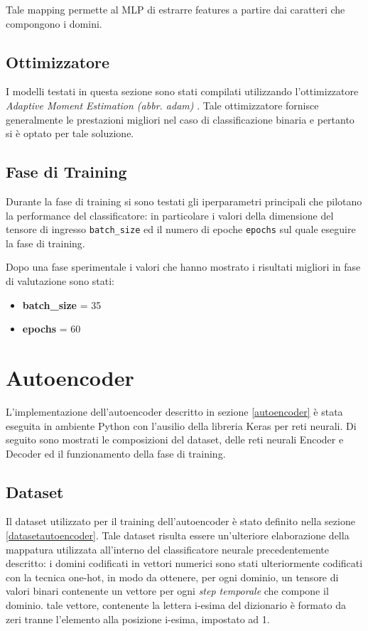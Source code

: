Tale mapping permette al MLP di estrarre features a partire dai caratteri che compongono i domini.

\subsection{Ottimizzatore}
I modelli testati in questa sezione sono stati compilati utilizzando l'ottimizzatore \textit{Adaptive Moment Estimation (abbr. adam)} \cite{adam}. Tale ottimizzatore fornisce generalmente le prestazioni migliori nel caso di classificazione binaria e pertanto si è optato per tale soluzione.

\subsection{Fase di Training}
Durante la fase di training si sono testati gli iperparametri principali che pilotano la performance del classificatore: in particolare i valori della dimensione del tensore di ingresso  \lstinline!batch_size! ed il numero di epoche \lstinline!epochs! sul quale eseguire la fase di training.

Dopo una fase sperimentale i valori che hanno mostrato i risultati migliori in fase di valutazione sono stati: 
\begin{itemize}
\item \textbf{batch\_size} = 35 
\item \textbf{epochs} = 60
\end{itemize}

\newpage
\section{Autoencoder}
\label{imp:autoencoder}
L'implementazione dell'autoencoder descritto in sezione \ref{autoencoder} è stata eseguita in ambiente Python con l'ausilio della libreria Keras per reti neurali. Di seguito sono mostrati le composizioni del dataset, delle reti neurali Encoder e Decoder ed il funzionamento della fase di training.


\subsection{Dataset}
\label{imp:autoencoder:dataset}
Il dataset utilizzato per il training dell'autoencoder è stato definito nella sezione \ref{datasetautoencoder}. Tale dataset risulta essere un'ulteriore elaborazione della mappatura utilizzata all'interno del classificatore neurale precedentemente descritto: i domini codificati in vettori numerici sono stati ulteriormente codificati con la tecnica one-hot, in modo da ottenere, per ogni dominio, un tensore di valori binari contenente un vettore per ogni \textit{step temporale} che compone il dominio. tale vettore, contenente la lettera i-esima del dizionario è formato da zeri tranne l'elemento alla posizione i-esima, impostato ad 1.

